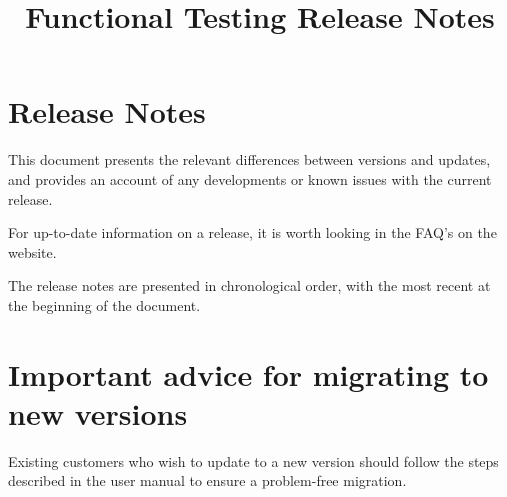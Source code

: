 
\title{Functional Testing Release Notes}
\author*{}{}
\maketitle

\setcounter{secnumdepth}{0}

\clearpage
\section{Release Notes}
This document presents the relevant differences between versions and updates, and provides an account of any developments or known issues with the current release. 

For up-to-date information on a release, it is worth looking in the FAQ's on the website. 

The release notes are presented in chronological order, with the most recent at the beginning of the document.  

\section{Important advice for migrating to new  versions}
Existing customers who wish to update to a new version should follow the steps described in the user manual to ensure a problem-free migration.






